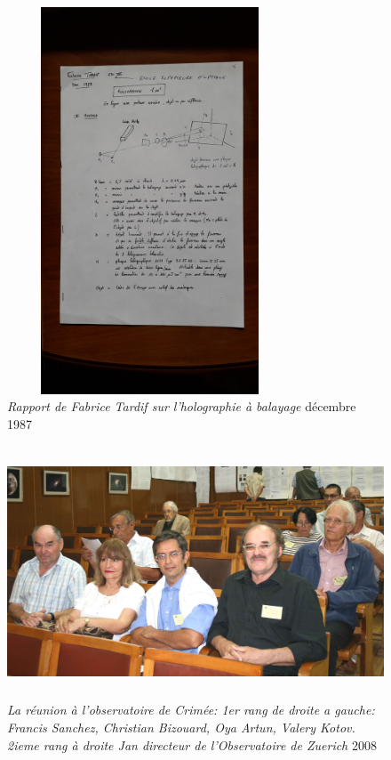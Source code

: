 \documentclass[a4paper,12pt]{article}
\begin{document}
\begin{appendix}
\begin{figure}
\centering
\includegraphics[width=8.5cm,height=11.5cm]{./figures/Tardif1987.jpg}
\caption[Rapport de Fabrice Tardif sur l'holographie à balayage]{\textit{Rapport de Fabrice Tardif sur l'holographie à balayage} décembre 1987}
\label{fig:18:figure18}
\end{figure}

\begin{figure}
\centering
\includegraphics[width=12.5cm,height=7.5cm]{./figures/Kotov.jpg}
\caption[Réunion à l'observatoire de Criméee]{\textit{La réunion à l'observatoire de Crimée: 1er rang de droite a gauche: Francis Sanchez, Christian Bizouard, Oya Artun, Valery Kotov. 2ieme rang à droite Jan directeur de l'Observatoire de Zuerich} 2008}
\label{fig:19:figure19}
\end{figure}


\end{appendix}
\end{document}
